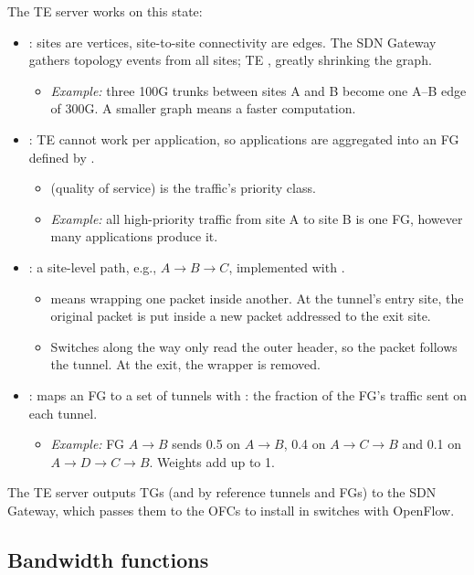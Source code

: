 The TE server works on this state:
\begin{itemize}
\item {}: sites are vertices, site-to-site connectivity are edges. The SDN Gateway gathers topology events from all sites; TE , greatly shrinking the graph.
  \begin{itemize}
  \item \emph{Example:} three 100G trunks between sites A and B become one A--B edge of 300G. A smaller graph means a faster computation.
  \end{itemize}
\item {}: TE cannot work per application, so applications are aggregated into an FG defined by .
  \begin{itemize}
  \item {} (quality of service) is the traffic's priority class.
  \item \emph{Example:} all high-priority traffic from site A to site B is one FG, however many applications produce it.
  \end{itemize}
\item {}: a site-level path, e.g., $A\to B\to C$, implemented with .
  \begin{itemize}
  \item {} means wrapping one packet inside another. At the tunnel's entry site, the original packet is put inside a new packet addressed to the exit site.
  \item Switches along the way only read the outer header, so the packet follows the tunnel. At the exit, the wrapper is removed.
  \end{itemize}
\item {}: maps an FG to a set of tunnels with : the fraction of the FG's traffic sent on each tunnel.
  \begin{itemize}
  \item \emph{Example:} FG $A\to B$ sends 0.5 on $A\to B$, 0.4 on $A\to C\to B$ and 0.1 on $A\to D\to C\to B$. Weights add up to 1.
  \end{itemize}
\end{itemize}
The TE server outputs TGs (and by reference tunnels and FGs) to the SDN Gateway, which passes them to the OFCs to install in switches with OpenFlow.

\subsection{Bandwidth functions}

